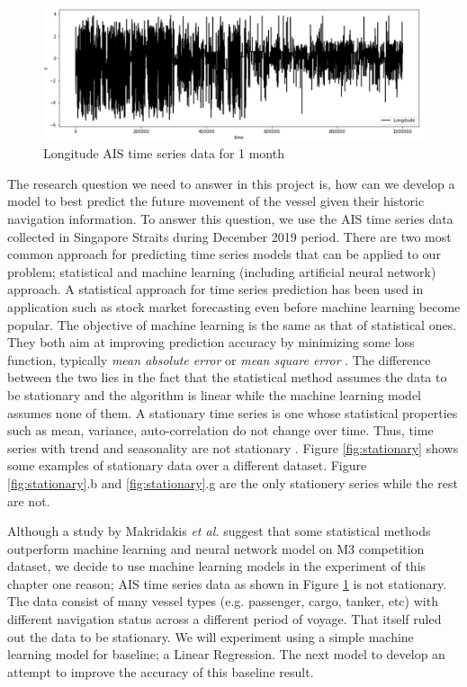 \begin{figure}[t!]
    \centering
    \includegraphics[width=14cm]{pic/ch-Univariate/longitude.png}
    \caption{Longitude AIS time series data for 1 month}
    \label{fig:longitude}
\end{figure}

The research question we need to answer in this project is, how can we develop a model to best predict the future movement of the vessel given their historic navigation information. To answer this question, we use the AIS time series data collected in Singapore Straits during December 2019 period. There are two most common approach for predicting time series models that can be applied to our problem; statistical and machine learning (including artificial neural network) approach. A statistical approach for time series prediction has been used in application such as stock market forecasting even before machine learning become popular. The objective of machine learning is the same as that of statistical ones. They both aim at improving prediction accuracy by minimizing some loss function, typically \emph{mean absolute error} or \emph{mean square error} \cite{makridakis2018statistical}. The difference between the two lies in the fact that the statistical method assumes the data to be stationary and the algorithm is linear while the machine learning model assumes none of them. A stationary time series is one whose statistical properties such as mean, variance, auto-correlation do not change over time. Thus, time series with trend and seasonality are not stationary \cite{hyndman2018forecasting}. Figure \ref{fig:stationary} shows some examples of stationary data over a different dataset. Figure \ref{fig:stationary}.b and \ref{fig:stationary}.g are the only stationery series while the rest are not. 

Although a study by Makridakis \emph{et al.} suggest that some statistical methods outperform machine learning and neural network model on M3 competition dataset, we decide to use machine learning models in the experiment of this chapter one reason; AIS time series data as shown in Figure \ref{fig:longitude} is not stationary. The data consist of many vessel types (e.g. passenger, cargo, tanker, etc) with different navigation status across a different period of voyage. That itself ruled out the data to be stationary. We will experiment using a simple machine learning model for baseline; a Linear Regression. The next model to develop an attempt to improve the accuracy of this baseline result.

